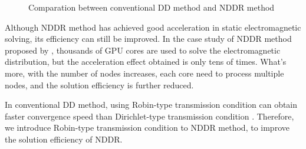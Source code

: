 \documentclass[journal,transmag]{IEEEtran}
\begin{document}
\begin{figure}
	\centering
	\caption{Comparation between conventional DD method and NDDR method}
\end{figure}
Although NDDR method has achieved good acceleration in static electromagnetic solving, its efficiency can still be improved. In the case study of NDDR method proposed by \cite{IEEEhowto:Liu}, thousands of GPU cores are used to solve the electromagnetic distribution, but the acceleration effect obtained is only tens of times. What's more, with the number of nodes increases, each core need to process multiple nodes, and the solution efficiency is further reduced.

In conventional DD method, using Robin-type transmission condition  can obtain faster convergence speed than Dirichlet-type transmission condition \cite{IEEEhowto:Douglas}. Therefore, we introduce Robin-type transmission condition to NDDR method, to improve the solution efficiency of NDDR.
\end{document}
